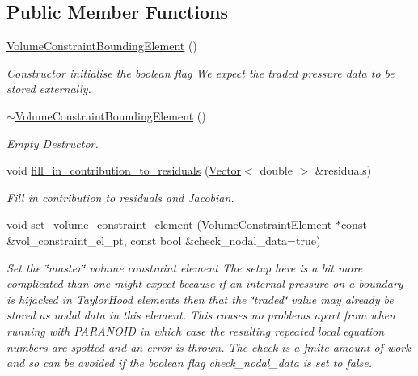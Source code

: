\subsection*{Public Member Functions}
\begin{DoxyCompactItemize}
\item 
\hyperlink{classoomph_1_1VolumeConstraintBoundingElement_a423139995a5543fda59d36cf230edb44}{Volume\+Constraint\+Bounding\+Element} ()
\begin{DoxyCompactList}\small\item\em Constructor initialise the boolean flag We expect the traded pressure data to be stored externally. \end{DoxyCompactList}\item 
\hyperlink{classoomph_1_1VolumeConstraintBoundingElement_a6a54150611ce06f05ea47ba99cf9e132}{$\sim$\+Volume\+Constraint\+Bounding\+Element} ()
\begin{DoxyCompactList}\small\item\em Empty Destructor. \end{DoxyCompactList}\item 
void \hyperlink{classoomph_1_1VolumeConstraintBoundingElement_a0ae62125450a5d203bc6d26b0d24be22}{fill\+\_\+in\+\_\+contribution\+\_\+to\+\_\+residuals} (\hyperlink{classoomph_1_1Vector}{Vector}$<$ double $>$ \&residuals)
\begin{DoxyCompactList}\small\item\em Fill in contribution to residuals and Jacobian. \end{DoxyCompactList}\item 
void \hyperlink{classoomph_1_1VolumeConstraintBoundingElement_a310fbaeb9a024406e4f769886e9f902a}{set\+\_\+volume\+\_\+constraint\+\_\+element} (\hyperlink{classoomph_1_1VolumeConstraintElement}{Volume\+Constraint\+Element} $\ast$const \&vol\+\_\+constraint\+\_\+el\+\_\+pt, const bool \&check\+\_\+nodal\+\_\+data=true)
\begin{DoxyCompactList}\small\item\em Set the \char`\"{}master\char`\"{} volume constraint element The setup here is a bit more complicated than one might expect because if an internal pressure on a boundary is hijacked in Taylor\+Hood elements then that the \char`\"{}traded\char`\"{} value may already be stored as nodal data in this element. This causes no problems apart from when running with P\+A\+R\+A\+N\+O\+ID in which case the resulting repeated local equation numbers are spotted and an error is thrown. The check is a finite amount of work and so can be avoided if the boolean flag check\+\_\+nodal\+\_\+data is set to false. \end{DoxyCompactList}\end{DoxyCompactItemize}
